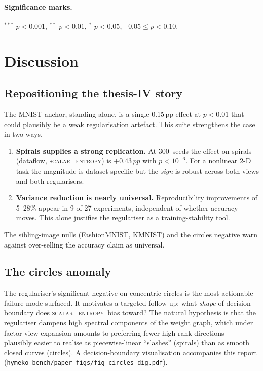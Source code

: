 \documentclass[11pt,a4paper]{article}
\newcommand{\pp}{\,pp\xspace}
\newcommand{\scalarH}{\textsc{scalar\_entropy}\xspace}
\begin{document}
\paragraph{Significance marks.}
$^{***}$ $p<0.001$, $^{**}$ $p<0.01$, $^{*}$ $p<0.05$, $^{.}$ $0.05\le p<0.10$.

\section{Discussion}

\subsection{Repositioning the thesis-IV story}

The MNIST anchor, standing alone, is a single 0.15\pp{} effect at
$p<0.01$ that could plausibly be a weak regularisation artefact. This
suite strengthens the case in two ways.
\begin{enumerate}
  \item \textbf{Spirals supplies a strong replication.} At 300~seeds the
    effect on spirals (dataflow, \scalarH) is $+0.43\pp$ with $p<10^{-6}$.
    For a nonlinear 2-D task the magnitude is dataset-specific but the
    \emph{sign} is robust across both views and both regularisers.
  \item \textbf{Variance reduction is nearly universal.}
    Reproducibility improvements of 5--28\% appear in 9 of 27
    experiments, independent of whether accuracy moves. This alone
    justifies the regulariser as a training-stability tool.
\end{enumerate}
The sibling-image nulls (FashionMNIST, KMNIST) and the circles negative
warn against over-selling the accuracy claim as universal.

\subsection{The circles anomaly}

The regulariser's significant negative on concentric-circles is the
most actionable failure mode surfaced. It motivates a targeted
follow-up: what \emph{shape} of decision boundary does \scalarH\ bias
toward? The natural hypothesis is that the regulariser dampens high
spectral components of the weight graph, which under factor-view
expansion amounts to preferring fewer high-rank directions --- plausibly
easier to realise as piecewise-linear ``slashes'' (spirals) than as
smooth closed curves (circles). A decision-boundary visualisation
accompanies this report
(\texttt{hymeko\_bench/paper\_figs/fig\_circles\_dig.pdf}).
\end{document}
